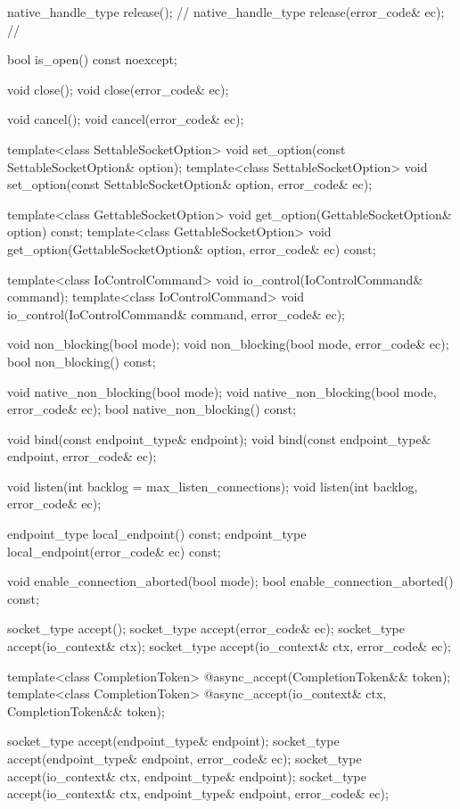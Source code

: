 \begin{codeblock}
{{{    native_handle_type release(); // \nativeref
    native_handle_type release(error_code& ec); // \nativeref

    bool is_open() const noexcept;

    void close();
    void close(error_code& ec);

    void cancel();
    void cancel(error_code& ec);

    template<class SettableSocketOption>
      void set_option(const SettableSocketOption& option);
    template<class SettableSocketOption>
      void set_option(const SettableSocketOption& option, error_code& ec);

    template<class GettableSocketOption>
      void get_option(GettableSocketOption& option) const;
    template<class GettableSocketOption>
      void get_option(GettableSocketOption& option, error_code& ec) const;

    template<class IoControlCommand>
      void io_control(IoControlCommand& command);
    template<class IoControlCommand>
      void io_control(IoControlCommand& command, error_code& ec);

    void non_blocking(bool mode);
    void non_blocking(bool mode, error_code& ec);
    bool non_blocking() const;

    void native_non_blocking(bool mode);
    void native_non_blocking(bool mode, error_code& ec);
    bool native_non_blocking() const;

    void bind(const endpoint_type& endpoint);
    void bind(const endpoint_type& endpoint, error_code& ec);

    void listen(int backlog = max_listen_connections);
    void listen(int backlog, error_code& ec);

    endpoint_type local_endpoint() const;
    endpoint_type local_endpoint(error_code& ec) const;

    void enable_connection_aborted(bool mode);
    bool enable_connection_aborted() const;

    socket_type accept();
    socket_type accept(error_code& ec);
    socket_type accept(io_context& ctx);
    socket_type accept(io_context& ctx, error_code& ec);

    template<class CompletionToken>
      @\DEDUCED@ async_accept(CompletionToken&& token);
    template<class CompletionToken>
      @\DEDUCED@ async_accept(io_context& ctx, CompletionToken&& token);

    socket_type accept(endpoint_type& endpoint);
    socket_type accept(endpoint_type& endpoint, error_code& ec);
    socket_type accept(io_context& ctx, endpoint_type& endpoint);
    socket_type accept(io_context& ctx, endpoint_type& endpoint,
                       error_code& ec);

}}}
\end{codeblock}
